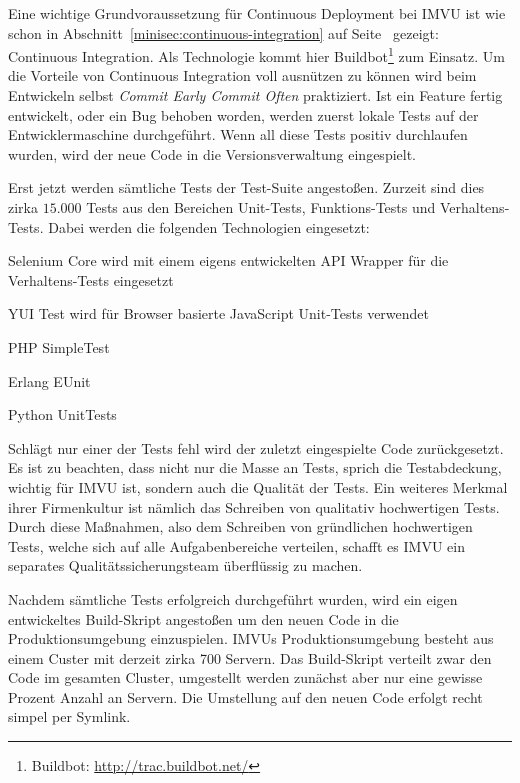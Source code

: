  Eine wichtige Grundvoraussetzung für Continuous Deployment
bei IMVU ist wie schon in Abschnitt~\ref{minisec:continuous-integration} auf
Seite~\pageref{minisec:continuous-integration} gezeigt: Continuous
Integration. Als Technologie kommt hier Buildbot\footnote{Buildbot:
\url{http://trac.buildbot.net/}} zum Einsatz. Um die Vorteile von Continuous
Integration voll ausnützen zu können wird beim Entwickeln selbst \emph{Commit
Early Commit Often} praktiziert. Ist ein Feature fertig entwickelt, oder ein
Bug behoben worden, werden zuerst lokale Tests auf der Entwicklermaschine
durchgeführt. Wenn all diese Tests positiv durchlaufen wurden, wird der neue
Code in die Versionsverwaltung eingespielt.

Erst jetzt werden sämtliche Tests der Test-Suite angestoßen. Zurzeit sind
dies zirka $15.000$ Tests aus den Bereichen Unit-Tests, Funktions-Tests und
Verhaltens-Tests. Dabei werden die folgenden Technologien eingesetzt:

\begin{itemize*}
    \item Selenium Core wird mit einem eigens entwickelten API Wrapper für
          die Verhaltens-Tests eingesetzt
    \item YUI Test wird für Browser basierte JavaScript Unit-Tests verwendet
    \item PHP SimpleTest
    \item Erlang EUnit
    \item Python UnitTests
\end{itemize*}

Schlägt nur einer der Tests fehl wird der zuletzt eingespielte Code
zurückgesetzt. Es ist zu beachten, dass nicht nur die Masse an Tests, sprich
die Testabdeckung, wichtig für IMVU ist, sondern auch die Qualität der Tests.
Ein weiteres Merkmal ihrer Firmenkultur ist nämlich das Schreiben von
qualitativ hochwertigen Tests. Durch diese Maßnahmen, also dem Schreiben von
gründlichen hochwertigen Tests, welche sich auf alle Aufgabenbereiche
verteilen, schafft es IMVU ein separates Qualitätssicherungsteam überflüssig
zu machen.

Nachdem sämtliche Tests erfolgreich durchgeführt wurden, wird ein eigen
entwickeltes Build-Skript angestoßen um den neuen Code in die
Produktionsumgebung einzuspielen. IMVUs Produktionsumgebung besteht aus einem
Custer mit derzeit zirka 700 Servern. Das Build-Skript verteilt zwar den Code
im gesamten Cluster, umgestellt werden zunächst aber nur eine gewisse Prozent
Anzahl an Servern. Die Umstellung auf den neuen Code erfolgt recht simpel per
Symlink. 

